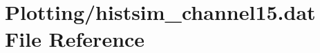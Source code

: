 \hypertarget{Plotting_2histsim__channel15_8dat}{}\section{Plotting/histsim\+\_\+channel15.dat File Reference}
\label{Plotting_2histsim__channel15_8dat}
